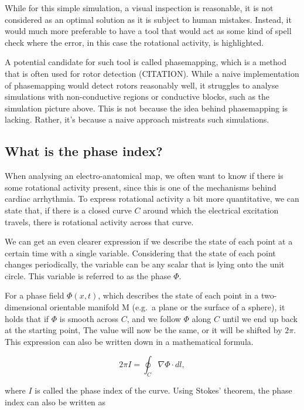 \documentclass[twocolumn]{article}
\begin{document}
While for this simple simulation, a visual inspection is reasonable,
it is not considered as an optimal solution as it is subject to human mistakes.
Instead, it would much more preferable to have a tool
that would act as some kind of spell check where the error,
in this case the rotational activity, is highlighted.

A potential candidate for such tool is called phasemapping,
which is a method that is often used for rotor detection (CITATION).
While a naive implementation of phasemapping would detect rotors
reasonably well,
it struggles to analyse simulations with non-conductive regions or
conductive blocks,
such as the simulation picture above.
This is not because the idea behind phasemapping is lacking.
Rather, it's because a naive approach mistreats such simulations.

\subsection{What is the phase index?}\label{what-is-the-phase-index}

When analysing an electro-anatomical map, we often want to know if there
is some rotational activity present, since this is one of the mechanisms
behind cardiac arrhythmia. To express rotational activity a bit more
quantitative, we can state that, if there is a closed curve \(C\) around
which the electrical excitation travels, there is rotational activity
across that curve.

We can get an even clearer expression if we describe the state of each
point at a certain time with a single variable. Considering that the
state of each point changes periodically, the variable can be any scalar
that is lying onto the unit circle. This variable is referred to as the
phase \(\Phi\).

For a phase field \(\Phi(x, t)\), which describes the state of each
point in a two-dimensional orientable manifold M (e.g.~a plane or the
surface of a sphere), it holds that if \(\Phi\) is smooth across \(C\),
and we follow \(\Phi\) along \(C\) until we end up back at the starting
point, The value will now be the same, or it will be shifted by
\(2\pi\). This expression can also be written down in a mathematical
formula.

\begin{equation}
  2\pi I = \oint_C \nabla \Phi \cdot dl ,
  \label{eq:phase-index}
\end{equation}

\noindent where \(I\) is called the phase index of the curve. Using Stokes'
theorem, the phase index can also be written as
\end{document}
